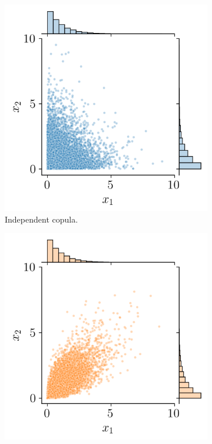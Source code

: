 \begin{figure}[ht]
    \centering
    \begin{subfigure}[b]{0.32\textwidth}
        \centering
        \includegraphics[width=\textwidth]{../numerical_experiments/chapter1/figures/independent_copula.png}
        \caption{Independent copula.}
    \end{subfigure}
    \hfill
    \begin{subfigure}[b]{0.32\textwidth}
        \centering
        \includegraphics[width=\textwidth]{../numerical_experiments/chapter1/figures/normal_copula.png}

\end{subfigure}
\end{figure}
